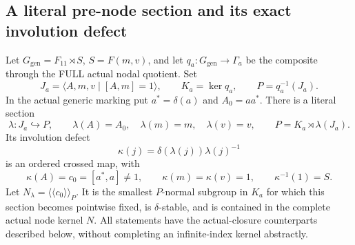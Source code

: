 \subsection*{A literal pre-node section and its exact involution defect}
\label{stmt:B159}
Let $G_{\mathrm{gen}}=F_{11}\rtimes S$, $S=F(m,v)$, and let
$q_a:G_{\mathrm{gen}}\to\Gamma_a$ be the composite through the FULL
actual nodal quotient. Set
\[
 J_a=\langle A,m,v\mid[A,m]=1\rangle,\qquad
 K_a=\ker q_a,\qquad P=q_a^{-1}(J_a).
\]
In the actual generic marking put $a^*=\delta(a)$ and $A_0=aa^*$.
There is a literal section
\[
 \lambda:J_a\hookrightarrow P,\qquad
 \lambda(A)=A_0,\quad\lambda(m)=m,\quad\lambda(v)=v,
 \qquad P=K_a\rtimes\lambda(J_a).
\]
Its involution defect
\begin{equation}\label{eq:B159-crossed}
 \kappa(j)=\delta(\lambda(j))\lambda(j)^{-1}
\end{equation}
is an ordered crossed map, with
\[
 \kappa(A)=c_0=[a^*,a]\ne1,\qquad
 \kappa(m)=\kappa(v)=1,\qquad
 \kappa^{-1}(1)=S.
\]
Let $N_\lambda=\langle\!\langle c_0\rangle\!\rangle_P$.
It is the smallest $P$-normal subgroup in $K_a$ for which this section
becomes pointwise fixed, is $\delta$-stable, and is contained in the
complete actual node kernel $N$. All statements have the actual-closure
counterparts described below, without completing an infinite-index
kernel abstractly.
